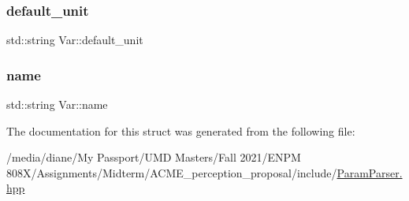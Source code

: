 \subsubsection{\texorpdfstring{default\+\_\+unit}{default\_unit}}
{\footnotesize\ttfamily std\+::string Var\+::default\+\_\+unit}

\mbox{\label{struct_var_ad112053ba9381eb7b8b26b3c5702410a}} 
\subsubsection{\texorpdfstring{name}{name}}
{\footnotesize\ttfamily std\+::string Var\+::name}



The documentation for this struct was generated from the following file\+:\begin{DoxyCompactItemize}
\item 
/media/diane/\+My Passport/\+U\+M\+D Masters/\+Fall 2021/\+E\+N\+P\+M 808\+X/\+Assignments/\+Midterm/\+A\+C\+M\+E\+\_\+perception\+\_\+proposal/include/\hyperlink{_param_parser_8hpp}{Param\+Parser.\+hpp}\end{DoxyCompactItemize}
